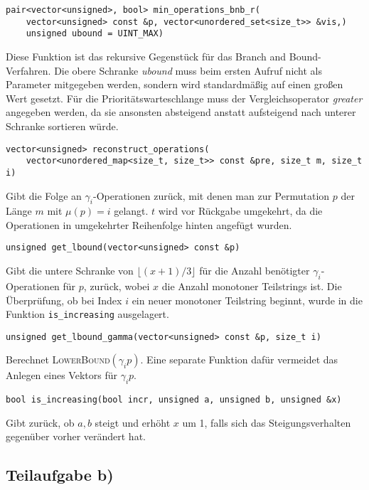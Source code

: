 \documentclass[a4paper, 10pt, ngerman]{article}
\begin{document}
\noindent \verb|pair<vector<unsigned>, bool> min_operations_bnb_r(| \\
\verb|    vector<unsigned> const &p, vector<unordered_set<size_t>> &vis,)| \\
\verb|    unsigned ubound = UINT_MAX)|
\smallskip

\noindent Diese Funktion ist das rekursive Gegenstück für das Branch and Bound-Verfahren. Die obere Schranke \emph{ubound} muss beim ersten Aufruf nicht als Parameter mitgegeben werden, sondern wird standardmäßig auf einen großen Wert gesetzt. Für die Prioritätswarteschlange muss der Vergleichsoperator \emph{greater} angegeben werden, da sie ansonsten absteigend anstatt aufsteigend nach unterer Schranke sortieren würde.
\bigskip

\noindent \verb|vector<unsigned> reconstruct_operations(| \\
\verb|    vector<unordered_map<size_t, size_t>> const &pre, size_t m, size_t i)|
\smallskip

\noindent Gibt die Folge an $\gamma_i$-Operationen zurück, mit denen man zur Permutation $p$ der Länge $m$ mit $\mu(p) = i$ gelangt. $t$ wird vor Rückgabe umgekehrt, da die Operationen in umgekehrter Reihenfolge hinten angefügt wurden.
\bigskip

\noindent \verb|unsigned get_lbound(vector<unsigned> const &p)|
\smallskip

\noindent Gibt die untere Schranke von $\lfloor (x + 1)/ 3 \rfloor$ für die Anzahl benötigter $\gamma_i$-Operationen für $p$, zurück, wobei $x$ die Anzahl monotoner Teilstrings ist. Die Überprüfung, ob bei Index $i$ ein neuer monotoner Teilstring beginnt, wurde in die Funktion \verb|is_increasing| ausgelagert.
\bigskip

\noindent \verb|unsigned get_lbound_gamma(vector<unsigned> const &p, size_t i)|
\smallskip

\noindent Berechnet \textsc{LowerBound}$(\gamma_i p)$. Eine separate Funktion dafür vermeidet das Anlegen eines Vektors für $\gamma_i p$.
\bigskip

\noindent \verb|bool is_increasing(bool incr, unsigned a, unsigned b, unsigned &x)|
\smallskip

\noindent Gibt zurück, ob $a, b$ steigt und erhöht $x$ um 1, falls sich das Steigungsverhalten gegenüber vorher verändert hat.

\subsection{Teilaufgabe b)}
\end{document}

